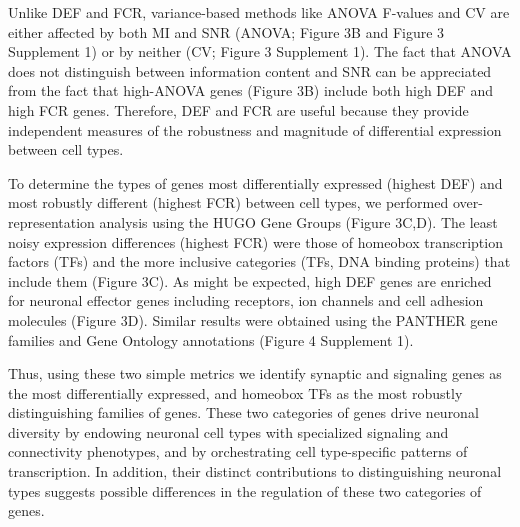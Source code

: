 Unlike DEF and FCR, variance-based methods like ANOVA F-values and CV are either affected by both MI and SNR (ANOVA; Figure 3B and Figure 3 Supplement 1) or by neither (CV; Figure 3 Supplement 1). The fact that ANOVA does not distinguish between information content and SNR can be appreciated from the fact that high-ANOVA genes (Figure 3B) include both high DEF and high FCR genes. Therefore, DEF and FCR are useful because they provide independent measures of the robustness and magnitude of differential expression between cell types.

To determine the types of genes most differentially expressed (highest DEF) and most robustly different (highest FCR) between cell types, we performed over-representation analysis using the HUGO Gene Groups \cite{Braschi_2018}(Figure 3C,D). The least noisy expression differences (highest FCR) were those of homeobox transcription factors (TFs) and the more inclusive categories (TFs, DNA binding proteins) that include them (Figure 3C). As might be expected, high DEF genes are enriched for neuronal effector genes including receptors, ion channels and cell adhesion molecules (Figure 3D). Similar results were obtained using the PANTHER gene families \citep{Mi_2016} and Gene Ontology annotations\cite{Ashburner_2000} (Figure 4 Supplement 1).  

Thus, using these two simple metrics we identify synaptic and signaling genes as the most differentially expressed, and homeobox TFs as the most robustly distinguishing families of genes. These two categories of genes drive neuronal diversity by endowing neuronal cell types with specialized signaling and connectivity phenotypes, and by orchestrating cell type-specific patterns of transcription. In addition, their distinct contributions to distinguishing neuronal types suggests possible differences in the regulation of these two categories of genes. 


